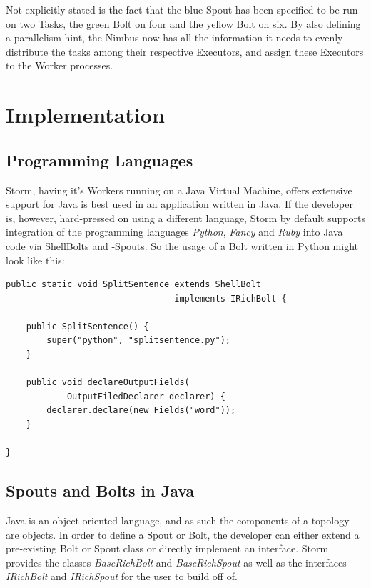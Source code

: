 \documentclass[12pt,a4paper]{article}
\begin{document}
Not explicitly stated is the fact that the blue Spout has been specified to be run on two Tasks, the green Bolt on four and the yellow Bolt on six. By also defining a parallelism hint, the Nimbus now has all the information it needs to evenly distribute the tasks among their respective Executors, and assign these Executors to the Worker processes.
\section{Implementation}
\subsection{Programming Languages}
Storm, having it's Workers running on a Java Virtual Machine, offers extensive support for Java is best used in an application written in Java. If the developer is, however, hard-pressed on using a different language, Storm by default supports integration of the programming languages \textit{Python}, \textit{Fancy} and \textit{Ruby} into Java code via ShellBolts and -Spouts. So the usage of a Bolt written in Python might look like this:\\
\begin{lstlisting}
public static void SplitSentence extends ShellBolt
                                 implements IRichBolt {
                                 
    public SplitSentence() {
        super("python", "splitsentence.py");
    }
    
    public void declareOutputFields(
            OutputFiledDeclarer declarer) {
        declarer.declare(new Fields("word"));
    }
    
}
\end{lstlisting}
\subsection{Spouts and Bolts in Java}
\label{sec:ImplementComponents}
Java is an object oriented language, and as such the components of a topology are objects. In order to define a Spout or Bolt, the developer can either extend a pre-existing Bolt or Spout class or directly implement an interface. Storm provides the classes \textit{BaseRichBolt} and \textit{BaseRichSpout} as well as the interfaces \textit{IRichBolt} and \textit{IRichSpout} for the user to build off of.\\
\end{document}
